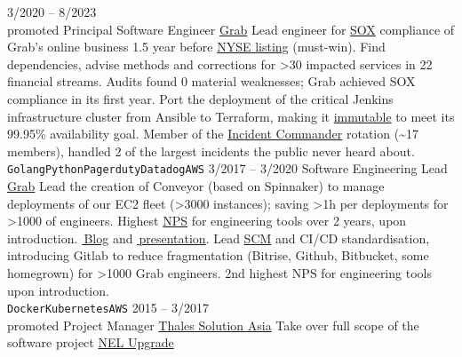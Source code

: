 \documentclass[9pt]{developercv} %
\begin{document}
\begin{entrylist}
  \entry
  {3/2020 -- 8/2023\\\footnotesize{promoted}}
  {Principal Software Engineer}
  {\href{http://www.grab.com}{Grab}}
  {
	Lead engineer for \href{https://www.sarbanes-oxley-101.com/SOX-404.htm}{SOX} compliance of Grab's online business 1.5 year before \href{https://www.grab.com/my/press/others/grab-celebrates-public-listing-milestone/}{NYSE listing} (must-win). Find dependencies, advise methods and corrections for >30 impacted services in 22 financial streams. Audits found 0 material weaknesses; Grab achieved SOX compliance in its first year.
	\bulletsep{}
	Port the deployment of the critical Jenkins infrastructure cluster from Ansible to Terraform, making it  \href{https://www.daily-devops.com/devops/immutable/architecture-patterns/why-immutable-infra/}{immutable} to meet its 99.95\% availability goal.
	\bulletsep{}
	Member of the \href{https://www.pagerduty.com/resources/learn/what-is-incident-commander/}{Incident Commander} rotation (\textasciitilde17 members), handled 2 of the largest incidents the public never heard about.
	\\
	\texttt{Golang}\slashsep\texttt{Python}\slashsep\texttt{Pagerduty}\slashsep\texttt{Datadog}\slashsep\texttt{AWS}
  }
  \entry
  {3/2017 -- 3/2020}
  {Software Engineering Lead}
  {\href{http://www.grab.com}{Grab}}
  {
    Lead the creation of Conveyor (based on Spinnaker) to manage deployments of our EC2 fleet (>3000 instances); saving >1h per deployments for >1000 of engineers. Highest \href{https://en.wikipedia.org/wiki/Net_promoter_score}{NPS} for engineering tools over 2 years, upon introduction. \href{https://medium.com/grab/in-the-first-part-of-this-blog-post-youve-read-about-the-improvements-made-to-our-build-and-e56c90b56497}{\faMedium\,Blog} and \href{https://www.youtube.com/watch?v=4RNvrg67wns}{\faYoutubePlay\,presentation}.
	\bulletsep{}
    Lead \href{https://www.atlassian.com/git/tutorials/source-code-management}{SCM} and CI/CD standardisation, introducing Gitlab to reduce fragmentation (Bitrise, Github, Bitbucket, some homegrown) for >1000 Grab engineers. 2nd highest NPS for engineering tools upon introduction.\\
	\texttt{Docker}\slashsep\texttt{Kubernetes}\slashsep\texttt{AWS}
  }
  \entry
  {2015 -- 3/2017\\\footnotesize{promoted}}
  {Project Manager}
  {\href{http://www.thalesgroup.com}{Thales Solution Asia}}
  {
	Take over full scope of the software project
	\href{https://en.wikipedia.org/wiki/North_East_MRT_line}{NEL Upgrade}
}
\end{entrylist}
\end{document}
